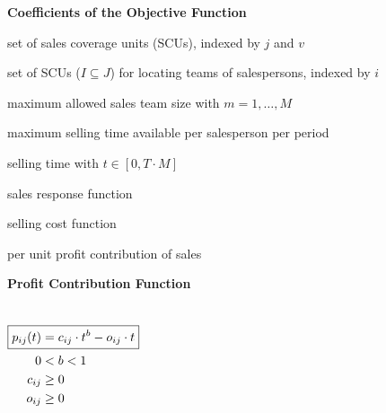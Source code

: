 \begin{frame}{\textbf{Coefficients of the Objective Function}}
\begin{description}
	\item[$J$]       set of sales coverage units (SCUs), indexed by $j$ and $v$
  \item[$I$]       set of SCUs ($I \subseteq J$) for locating teams of salespersons, indexed by $i$
  \item[$M$] maximum allowed sales team size with $m = 1,\dots,M$
  \item[$T$] maximum selling time available per salesperson per period
  \item[$t$]       selling time with $t \in \left[0,T \cdot M\right]$									
  \item<2->[$s_{ij}(t)$]  sales response function
  \item<2->[$k_{ij}(t)$]  selling cost function
	\item<2->[$\alpha$] per unit profit contribution of sales
\end{description}
\vfill
{}
\end{frame}





\begin{frame}{\textbf{Profit Contribution Function}}
\begin{columns}
\centering
\begin{align*}
\Aboxed{p_{ij}(t) &= c_{ij} \cdot t^b - o_{ij} \cdot t}\\
0 &< b < 1 \\
c_{ij} &\geq 0 \\
o_{ij} &\geq 0 \\
\end{align*}
\begin{figure}[h!]
	\centering
\scalebox{1}{

}
	\label{fig:ProfitContri_Elast}
\end{figure}
\end{columns}
\end{frame}



